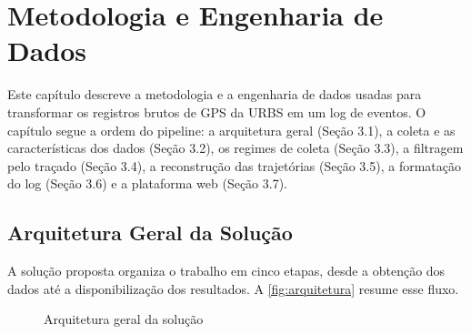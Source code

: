 
\chapter{Metodologia e Engenharia de Dados}\label{cap:metodologia}

Este capítulo descreve a metodologia e a engenharia de dados usadas para transformar os registros brutos de GPS da URBS em um log de eventos. O capítulo segue a ordem do pipeline: a arquitetura geral (Seção 3.1), a coleta e as características dos dados (Seção 3.2), os regimes de coleta (Seção 3.3), a filtragem pelo traçado (Seção 3.4), a reconstrução das trajetórias (Seção 3.5), a formatação do log (Seção 3.6) e a plataforma web (Seção 3.7).

\section{Arquitetura Geral da Solução}\label{sec:arquitetura}

A solução proposta organiza o trabalho em cinco etapas, desde a obtenção dos dados até a disponibilização dos resultados. A \autoref{fig:arquitetura} resume esse fluxo.

\begin{figure}[htb]
\caption{Arquitetura geral da solução}
\label{fig:arquitetura}
\centering
{}
\fonte{}
\end{figure}

